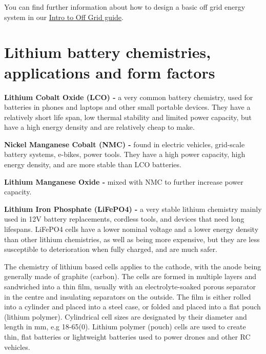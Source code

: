\documentclass{article}
\theoremstyle{definition}
\theoremstyle{definition}
\theoremstyle{remark}
\begin{document}
  You can find further information about how to design a basic off grid energy system in our \href{https://www.demandenergyequality.org/get-started-with-offgrid}{Intro to Off Grid guide}.


\section{Lithium battery chemistries, applications and form factors} %
\label{sec:lithium_battery_chemistries_applications_and_form_factors}
  
  \textbf{Lithium Cobalt Oxide (LCO) -} a very common battery chemistry, used for batteries in phones and laptops and other small portable devices. They have a relatively short life span, low thermal stability and limited power capacity, but have a high energy density and are relatively cheap to make.

  \textbf{Nickel Manganese Cobalt (NMC) -} found in electric vehicles, grid-scale battery systems, e-bikes, power tools. They have a high power capacity, high energy density, and are more stable than LCO batteries.

  \textbf{Lithium Manganese Oxide -} mixed with NMC to further increase power capacity.

  \textbf{Lithium Iron Phosphate (LiFePO4) -} a very stable lithium chemistry mainly used in 12V battery replacements, cordless tools, and devices that need long lifespans. LiFePO4 cells have a lower nominal voltage and a lower energy density than other lithium chemistries, as well as being more expensive, but they are less susceptible to deterioration when fully charged, and are much safer. 

  The chemistry of lithium based cells applies to the cathode, with the anode being generally made of graphite (carbon). The cells are formed in multiple layers and sandwiched into a thin film, usually with an electrolyte-soaked porous separator in the centre and insulating separators on the outside. The film is either rolled into a cylinder and placed into a steel case, or folded and placed into a flat pouch (lithium polymer). Cylindrical cell sizes are designated by their diameter and length in mm, e.g 18-65(0). Lithium polymer (pouch) cells are used to create thin, flat batteries or lightweight batteries used to power drones and other RC vehicles.

\end{document}
